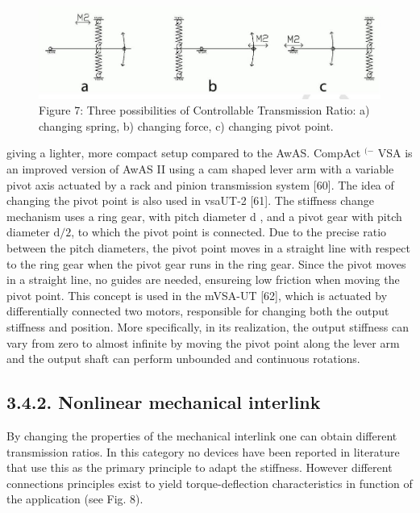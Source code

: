 \documentclass[10pt]{article}
\begin{document}
\begin{figure}[h]
\begin{center}
  \includegraphics[width=\textwidth]{2025_09_17_f0417c8723605e4ad1efg-16}
\captionsetup{labelformat=empty}
\caption{Figure 7: Three possibilities of Controllable Transmission Ratio: a) changing spring, b) changing force, c) changing pivot point.}
\end{center}
\end{figure}

giving a lighter, more compact setup compared to the AwAS. CompAct ${ }^{(-}$ VSA is an improved version of AwAS II using a cam shaped lever arm with a variable pivot axis actuated by a rack and pinion transmission system [60]. The idea of changing the pivot point is also used in vsaUT-2 [61]. The stiffness change mechanism uses a ring gear, with pitch diameter d , and a pivot gear with pitch diameter $\mathrm{d} / 2$, to which the pivot point is connected. Due to the precise ratio between the pitch diameters, the pivot point moves in a straight line with respect to the ring gear when the pivot gear runs in the ring gear. Since the pivot moves in a straight line, no guides are needed, ensureing low friction when moving the pivot point. This concept is used in the mVSA-UT [62], which is actuated by differentially connected two motors, responsible for changing both the output stiffness and position. More specifically, in its realization, the output stiffness can vary from zero to almost infinite by moving the pivot point along the lever arm and the output shaft can perform unbounded and continuous rotations.

\subsection*{3.4.2. Nonlinear mechanical interlink}
By changing the properties of the mechanical interlink one can obtain different transmission ratios. In this category no devices have been reported in literature that use this as the primary principle to adapt the stiffness. However different connections principles exist to yield torque-deflection characteristics in function of the application (see Fig. 8).
\end{document}
